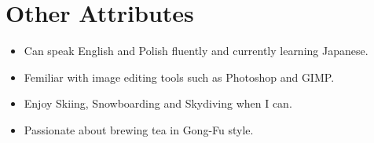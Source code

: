 \section*{Other Attributes}

\begin{itemize}
  \item Can speak English and Polish fluently and currently learning Japanese.
  \item Femiliar with image editing tools such as Photoshop and GIMP.
  \item Enjoy Skiing, Snowboarding and Skydiving when I can.
  \item Passionate about brewing tea in Gong-Fu style.
\end{itemize}
